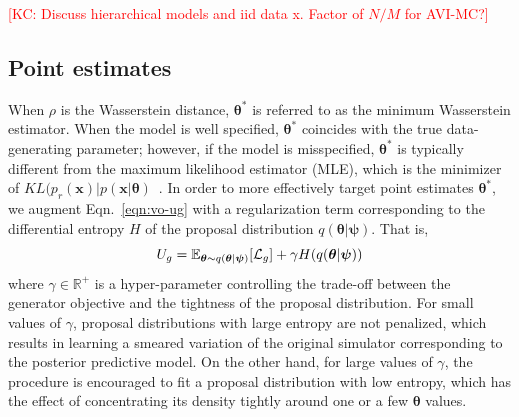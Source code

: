 \documentclass[twocolumn,superscriptaddress,aps]{revtex4-1}
\newcommand{\kcnote}[1]{\textcolor{red}{[KC: #1]}}
\newcommand{\qxpsi}{q(\mathbf{x}|\bfpsi)}
\newcommand{\bftheta}{{\bm \theta}}
\newcommand{\bfpsi}{{\bm \psi}}
\newcommand{\bfx}{\mathbf{x}}
\theoremstyle{plain}
\begin{document}



\kcnote{Discuss hierarchical models and iid data x. Factor of $N/M$ for AVI-MC?}


\subsection{Point estimates}


When $\rho$ is the Wasserstein distance, $\bftheta^*$ is referred to as the
minimum Wasserstein estimator. When the model is well specified, $\bftheta^*$
coincides with the true data-generating parameter; however, if the model is
misspecified, $\bftheta^*$ is typically different from the maximum likelihood
estimator (MLE), which is the minimizer of $KL(p_r(\bfx) | p(\bfx |
\bftheta)$~\citep{bernton2017inference}. In order to more effectively target
point estimates $\bftheta^*$, we augment Eqn.~\ref{eqn:vo-ug} with a
regularization term corresponding to the differential entropy $H$ of the
proposal distribution $q(\bftheta | \bfpsi)$. That is,
\begin{equation}
    U_g = \mathbb{E}_{\bftheta \sim q(\bftheta|\bfpsi)} [ {\cal L}_g ] + \gamma H(q(\bftheta|\bfpsi))
\end{equation}
where $\gamma \in \mathbb{R}^+$ is a hyper-parameter controlling the trade-off
between the generator objective and the tightness of the proposal distribution.
For small values of $\gamma$,
proposal distributions with large entropy are not penalized, which results
in learning a smeared variation of the original simulator corresponding to the posterior predictive model. On the other hand,
for large values of $\gamma$, the procedure is encouraged to fit a proposal
distribution with low entropy, which has the effect of concentrating its density
tightly around one or a few $\bftheta$ values.
\end{document}
